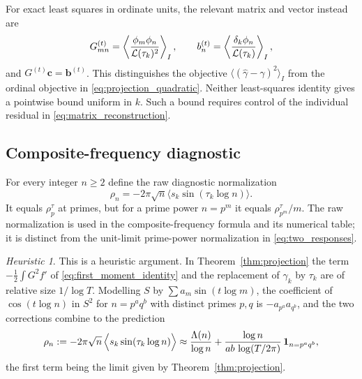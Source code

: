 \documentclass[11pt,reqno]{amsart}
\theoremstyle{plain}\newtheorem{theorem}{Theorem}[section]\newtheorem{proposition}[theorem]{Proposition}\newtheorem{lemma}[theorem]{Lemma}\newtheorem{corollary}[theorem]{Corollary}
\theoremstyle{definition}\newtheorem{hypothesis}[theorem]{Hypothesis}\newtheorem{definition}[theorem]{Definition}
\theoremstyle{remark}\newtheorem{remark}[theorem]{Remark}\newtheorem{experiment}[theorem]{Experiment}\newtheorem{question}[theorem]{Question}\newtheorem{heuristic}[theorem]{Heuristic}\newtheorem{conjecture}[theorem]{Conjecture}
\begin{document}
For exact least squares in ordinate units, the relevant matrix and vector instead are
\begin{equation}
 G^{(t)}_{mn}=\left\langle\frac{\phi_m\phi_n}{\mathcal L(\tau_k)^2}\right\rangle_I,
 \qquad
 b^{(t)}_n=\left\langle\frac{\delta_k\phi_n}{\mathcal L(\tau_k)}\right\rangle_I,
 \label{eq:weighted_Gram}
\end{equation}
and $G^{(t)}\mathbf c=\mathbf b^{(t)}$. This distinguishes the objective $\langle(\widehat\gamma-\gamma)^2\rangle_I$ from the ordinal objective in \eqref{eq:projection_quadratic}. Neither least-squares identity gives a pointwise bound uniform in $k$. Such a bound requires control of the individual residual in \eqref{eq:matrix_reconstruction}.

\subsection{Composite-frequency diagnostic}
\label{subsec:composite_diagnostic}
For every integer $n\ge2$ define the raw diagnostic normalization
\begin{equation}
\rho_n=-2\pi\sqrt n\langle s_k\sin(\tau_k\log n)\rangle.
\label{eq:raw_response}
\end{equation} It equals $\rho_p^\tau$ at primes, but for a prime power $n=p^m$ it equals $\rho_{p^m}^\tau/m$. The raw normalization is used in the composite-frequency formula and its numerical table; it is distinct from the unit-limit prime-power normalization in \eqref{eq:two_responses}.


\begin{heuristic}\label{heur:second_order}
This is a heuristic argument. In Theorem~\ref{thm:projection} the term $-\frac12\int G^2f'$ of \eqref{eq:first_moment_identity} and the replacement of $\gamma_k$ by $\tau_k$ are of relative size $1/\log T$. Modelling $S$ by $\sum a_m\sin(t\log m)$, the coefficient of $\cos(t\log n)$ in $S^2$ for $n=p^aq^b$ with distinct primes $p,q$ is $-a_{p^a}a_{q^b}$, and the two corrections combine to the prediction
\begin{equation}
\rho_n:=-2\pi\sqrt n\,\Bigl\langle s_k\sin(\tau_k\log n)\Bigr\rangle\approx\frac{\Lambda(n)}{\log n}+\frac{\log n}{ab\,\log(T/2\pi)}\,\mathbf 1_{n=p^aq^b},
\label{eq:second_order}
\end{equation}
the first term being the limit given by Theorem~\ref{thm:projection}.
\end{heuristic}
\end{document}
